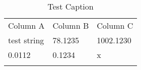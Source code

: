 \begin{table*}[h]
\caption{Test Caption}
\label{test:label}\begin{tabular}{lll}
\noalign{\smallskip}\hline\noalign{\smallskip}
Column A&Column B&Column C\\\noalign{\smallskip}\hline
test string&78.1235&1002.1230\\
0.0112&0.1234&x\\
\noalign{\smallskip}\hline
\end{tabular}
\end{table*}